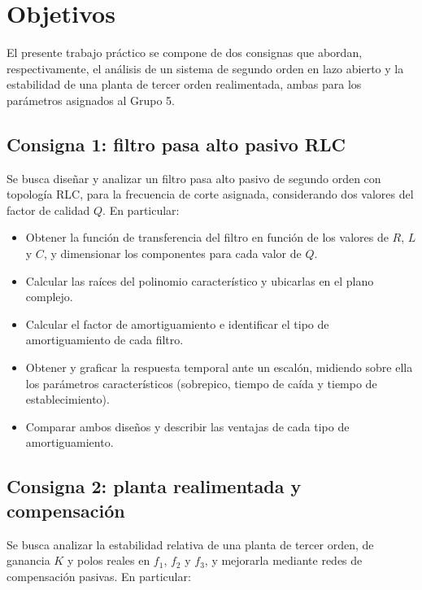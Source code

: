 \section{Objetivos}

El presente trabajo práctico se compone de dos consignas que abordan, respectivamente, el análisis de un
sistema de segundo orden en lazo abierto y la estabilidad de una planta de tercer orden realimentada, ambas
para los parámetros asignados al Grupo 5.

\subsection{Consigna 1: filtro pasa alto pasivo RLC}

Se busca diseñar y analizar un filtro pasa alto pasivo de segundo orden con topología RLC, para la
frecuencia de corte asignada, considerando dos valores del factor de calidad $Q$. En particular:

\begin{itemize}
  \item Obtener la función de transferencia del filtro en función de los valores de $R$, $L$ y $C$, y
        dimensionar los componentes para cada valor de $Q$.
  \item Calcular las raíces del polinomio característico y ubicarlas en el plano complejo.
  \item Calcular el factor de amortiguamiento e identificar el tipo de amortiguamiento de cada filtro.
  \item Obtener y graficar la respuesta temporal ante un escalón, midiendo sobre ella los parámetros
        característicos (sobrepico, tiempo de caída y tiempo de establecimiento).
  \item Comparar ambos diseños y describir las ventajas de cada tipo de amortiguamiento.
\end{itemize}

\subsection{Consigna 2: planta realimentada y compensación}

Se busca analizar la estabilidad relativa de una planta de tercer orden, de ganancia $K$ y polos reales en
$f_1$, $f_2$ y $f_3$, y mejorarla mediante redes de compensación pasivas. En particular:

